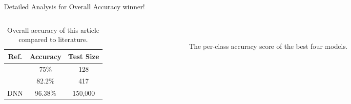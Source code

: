\begin{frame}[fragile]{Detailed Analysis for Overall Accuracy winner!}
		\begin{columns}

		\begin{column}{.3\textwidth}
			\begin{table}[h]
				\footnotesize 
				\centering
				\begin{tabular}{c c c}
					\toprule
					\textbf{Ref.}& \textbf{Accuracy}& \textbf{Test Size} \\
					\midrule
					\cite{Alnagdawi2013FindingArabicPoemMeter} & 75\% & 128\\
					\cite{Abuata2016RuleBasedAlgorithm}& 82.2\% & 417\\
					DNN & 96.38\%& 150,000 \\
					\bottomrule
				\end{tabular}
				\caption{{\scriptsize Overall accuracy of this article compared to literature}.}\label{Tab:Summary_Results}
			\end{table}		
		\end{column}
	
			\begin{column}{.7\textwidth}
		\begin{figure}[!t]
			
			\caption{{\scriptsize The per-class accuracy score of the best four models.}}~\label{Fig:ArabicModelsResults}
		\end{figure}
	\end{column}
	
		\end{columns}

\end{frame}




%


%	
%

